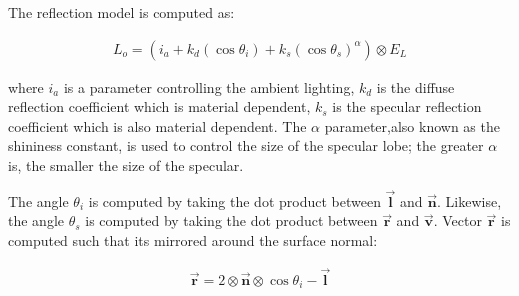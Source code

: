 \noindent The reflection model is computed as:

	\begin{eqnarray*}
		L_o = (i_a + k_d(\cos\theta_i) + k_s(\cos\theta_s)^\alpha) \otimes E_L
	\end{eqnarray*}

\noindent where $i_a$ is a parameter controlling the ambient lighting, $k_d$ is the diffuse reflection coefficient which is material dependent, $k_s$ is the specular reflection coefficient which is also material dependent. The $\alpha$ parameter,also known as the shininess constant, is used to control the size of the specular lobe; the greater $\alpha$ is, the smaller the size of the specular. 

The angle $\theta_i$ is computed by taking the dot product between $\vec{\mathbf{l}}$ and $\vec{\mathbf{n}}$. Likewise, the angle $\theta_s$ is computed by taking the dot product between $\vec{\mathbf{r}}$ and $\vec{\mathbf{v}}$. Vector $\vec{\mathbf{r}}$ is computed such that its mirrored around the surface normal:

	\begin{eqnarray*}
		\vec{\mathbf{r}} = 2 \otimes \vec{\mathbf{n}} \otimes \cos\theta_i - \vec{\mathbf{l}}
	\end{eqnarray*}



